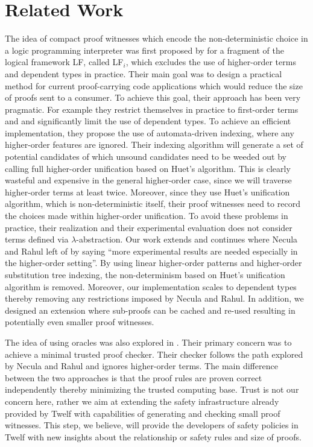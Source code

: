 \documentclass{llncs}
\newcommand{\ednote}[1]{\footnote{\it #1}}
\begin{document}
\section{Related Work}
The idea of compact proof witnesses which encode the
non-deterministic choice in a logic programming interpreter was first
proposed by \cite{Necula+01:oracle} for a fragment of the logical
framework LF, called LF$_i$, which excludes the use of higher-order
terms and dependent types in practice. 
Their main goal was to design a practical method for current
proof-carrying code applications which would reduce the size of proofs
sent to a consumer. To achieve this goal, their approach
has been very pragmatic. For example they restrict themselves in
practice to first-order terms and and significantly limit the use
of dependent types. To achieve an efficient
implementation, they propose the use of automata-driven indexing,
where any higher-order features are ignored. Their indexing algorithm
will generate a set of potential candidates of which unsound
candidates need to be weeded out by calling full 
higher-order unification based on Huet's algorithm. This is clearly
wasteful and expensive in the general higher-order case, since we will
traverse higher-order terms at least twice. Moreover, since they use
Huet's unification algorithm, which is non-deterministic itself, 
their proof witnesses need to record the choices made within
higher-order unification. To avoid these problems in practice, their
realization and their experimental evaluation does not consider terms
defined via $\lambda$-abstraction.  %
Our work extends and continues where Necula and Rahul left of by
saying ``more experimental results are needed especially in the
higher-order setting''. By using linear higher-order patterns and
higher-order substitution tree indexing, the non-determinism based on
Huet's unification algorithm is removed. Moreover, our implementation scales
to dependent types thereby removing any restrictions imposed by
Necula and Rahul. In addition, we designed an extension where
sub-proofs can be cached and re-used resulting in potentially even
smaller proof witnesses.

The idea of using oracles was also explored in
\cite{Appel:PPDP03}. Their primary concern was to 
achieve a minimal trusted proof checker. Their checker follows the
path explored by Necula and Rahul and ignores higher-order terms. The
main difference between the two approaches is that the proof rules are
proven correct independently thereby minimizing the trusted computing
base. Trust is not our concern here, rather we aim at extending the
safety infrastructure already provided by Twelf with capabilities of
generating and checking small proof witnesses. This step, we believe,
will provide the developers of safety policies in Twelf with new
insights about the relationship or safety rules and size of proofs.
\end{document}
